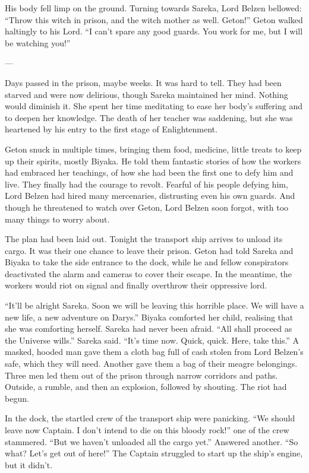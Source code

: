 His body fell limp on the ground. Turning towards Sareka, Lord Belzen bellowed: “Throw this witch in prison, and the witch mother as well. Geton!” Geton walked haltingly to his Lord. “I can’t spare any good guards. You work for me, but I will be watching you!”

---

Days passed in the prison, maybe weeks. It was hard to tell. They had been starved and were now delirious, though Sareka maintained her mind. Nothing would diminish it. She spent her time meditating to ease her body’s suffering and to deepen her knowledge. The death of her teacher was saddening, but she was heartened by his entry to the first stage of Enlightenment.

Geton snuck in multiple times, bringing them food, medicine, little treats to keep up their spirits, mostly Biyaka. He told them fantastic stories of how the workers had embraced her teachings, of how she had been the first one to defy him and live. They finally had the courage to revolt. Fearful of his people defying him, Lord Belzen had hired many mercenaries, distrusting even his own guards. And though he threatened to watch over Geton, Lord Belzen soon forgot, with too many things to worry about.

The plan had been laid out. Tonight the transport ship arrives to unload its cargo. It was their one chance to leave their prison. Geton had told Sareka and Biyaka to take the side entrance to the dock, while he and fellow conspirators deactivated the alarm and cameras to cover their escape. In the meantime, the workers would riot on signal and finally overthrow their oppressive lord.

“It’ll be alright Sareka. Soon we will be leaving this horrible place. We will have a new life, a new adventure on Darys.” Biyaka comforted her child, realising that she was comforting herself. Sareka had never been afraid. “All shall proceed as the Universe wills.” Sareka said. “It’s time now. Quick, quick. Here, take this.” A masked, hooded man gave them a cloth bag full of cash stolen from Lord Belzen’s safe, which they will need. Another gave them a bag of their meagre belongings. Three men led them out of the prison through narrow corridors and paths. Outside, a rumble, and then an explosion, followed by shouting. The riot had begun.

In the dock, the startled crew of the transport ship were panicking. “We should leave now Captain. I don’t intend to die on this bloody rock!” one of the crew stammered. “But we haven’t unloaded all the cargo yet.” Answered another. “So what? Let’s get out of here!” The Captain struggled to start up the ship’s engine, but it didn’t.

